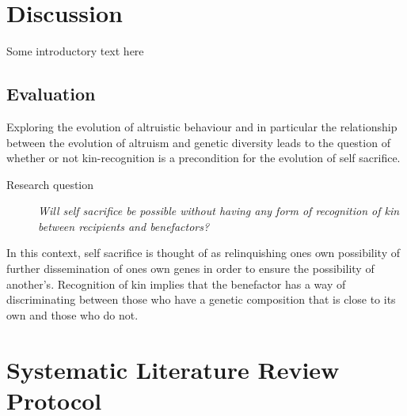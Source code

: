 \documentclass[a4paper]{book}
\begin{document}


\chapter{Discussion}
\label{cha:discussion}

Some introductory text here

\section{Evaluation}

Exploring the evolution of altruistic behaviour and in particular the relationship between the evolution of altruism and genetic diversity leads to the question of 
whether or not kin-recognition is a precondition for the evolution of self sacrifice. 


\begin{description}
\item[Research question] {\it Will self sacrifice be possible without having any form of recognition of
    kin between recipients and benefactors?}
\end{description}

In this context, self sacrifice is thought of as relinquishing ones own possibility of further dissemination of ones own genes in order to ensure the possibility of another's.
Recognition of kin implies that the benefactor has a way of discriminating between those who have a genetic composition that is close to its own and those who do not.


\chapter{Systematic Literature Review Protocol}\label{T-B}
\label{cha:STL}
\end{document}
